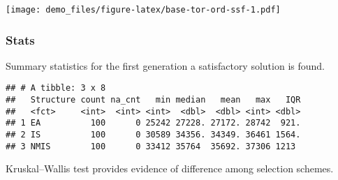 \documentclass[]{book}
\newenvironment{Shaded}{\begin{snugshade}}{\end{snugshade}}
\newcommand{\CharTok}[1]{\textcolor[rgb]{0.31,0.60,0.02}{#1}}
\newcommand{\DataTypeTok}[1]{\textcolor[rgb]{0.13,0.29,0.53}{#1}}
\newcommand{\DecValTok}[1]{\textcolor[rgb]{0.00,0.00,0.81}{#1}}
\newcommand{\KeywordTok}[1]{\textcolor[rgb]{0.13,0.29,0.53}{\textbf{#1}}}
\newcommand{\NormalTok}[1]{#1}
\newcommand{\OperatorTok}[1]{\textcolor[rgb]{0.81,0.36,0.00}{\textbf{#1}}}
\newcommand{\OtherTok}[1]{\textcolor[rgb]{0.56,0.35,0.01}{#1}}
\newcommand{\StringTok}[1]{\textcolor[rgb]{0.31,0.60,0.02}{#1}}
\begin{document}
\texttt{[image: demo\_files/figure-latex/base-tor-ord-ssf-1.pdf]}

\hypertarget{stats-4}{%
\subsubsection{Stats}\label{stats-4}}

Summary statistics for the first generation a satisfactory solution is found.

\begin{Shaded}
\end{Shaded}

\begin{verbatim}
## # A tibble: 3 x 8
##   Structure count na_cnt   min median   mean   max   IQR
##   <fct>     <int>  <int> <int>  <dbl>  <dbl> <int> <dbl>
## 1 EA          100      0 25242 27228. 27172. 28742  921.
## 2 IS          100      0 30589 34356. 34349. 36461 1564.
## 3 NMIS        100      0 33412 35764  35692. 37306 1213
\end{verbatim}

Kruskal--Wallis test provides evidence of difference among selection schemes.
\end{document}
